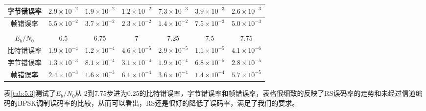 \begin{longtable}{|c||c|c|c|c|c|c|}
\hline
字节错误率&$2.9\times
    10^{-2}$&$1.9\times 10^{-2}$&$1.2\times 10^{-2}$&$7.3\times
    10^{-3}$&$3.9\times 10^{-3}$&$2.6\times 10^{-3}$\\
\hline
帧错误率&$5.5\times
    10^{-2}$&$3.7\times 10^{-2}$&$2.3\times 10^{-2}$&$1.4\times
    10^{-2}$&$7.5\times 10^{-3}$&$5.0\times 10^{-3}$\\
\hline
\multicolumn{7}{c}{\vspace{2pt}}\\
\hline
$E_b/N_0$&6.5&6.75&7&7.25&7.5&7.75\\
\hline
\hline
 比特错误率&$1.9\times 10^{-4}$&$1.2\times 10^{-4}$&$4.6\times
    10^{-5}$&$2.9\times 10^{-5}$&$1.1\times 10^{-5}$&$4.1\times
    10^{-6}$\\
\hline
 字节错误率&$1.3\times 10^{-3}$&$8.1\times 10^{-4}$&$3.1\times
    10^{-4}$&$1.9\times 10^{-4}$&$6.8\times 10^{-5}$&$2.8\times
    10^{-5}$\\
\hline
 帧错误率&$2.4\times 10^{-3}$&$1.6\times 10^{-3}$&$6.1\times
    10^{-4}$&$3.6\times 10^{-4}$&$1.4\times 10^{-4}$&$5.7\times
    10^{-5}$\\
\hline
\end{longtable}

表\ref{tab:5.3}测试了$E_b/N_0$从
2到7.75步进为0.25的比特错误率，字节错误率和帧错误率，表格很细致的反映了RS误码率的走势和未经过信道编码的BPSK调制误码率的比较，从而可以看出，RS还是很好的降低了误码率，满足了我们的要求。


